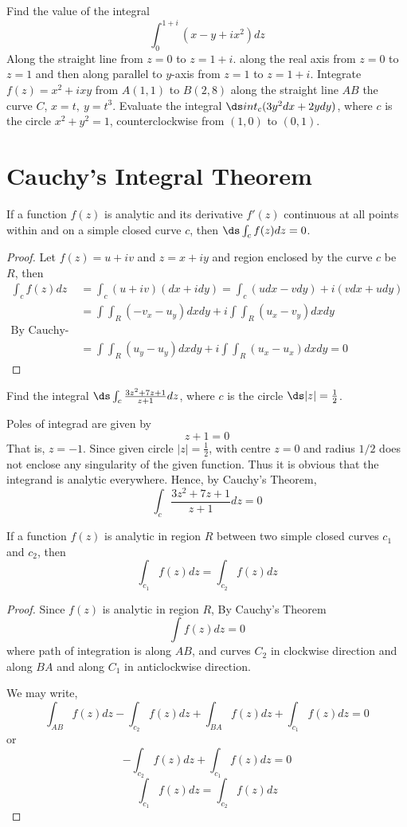 \begin{problems}
\prob Find the value of the integral 
\[\int_0^{1+i}(x-y+ix^2)dz\]
\subprob Along the straight line from $z=0$ to $z=1+i$.
\subprob along the real axis from $z=0$ to $z=1$ and then along parallel to $y$-axis from $z=1$ to $z=1+i$.
\prob Integrate $f(z) = x^2 + ixy$ from $A(1,1)$ to $B(2,8)$ along
\subprob the straight line $AB$
\subprob the curve $C$, $x=t, ~y=t^3$.
\prob Evaluate the integral $\ds int_c (3y^2dx+2ydy)$, where $c$ is the circle $x^2+y^2=1$, counterclockwise from $(1,0)$ to $(0,1)$.

\end{problems}

\section{Cauchy's Integral Theorem}
\begin{thm}
If a function $f(z)$ is analytic and its derivative $f'(z)$ continuous at all points within and on a simple closed curve $c$, then $\ds \int_c f(z) dz = 0$.
\end{thm}
\begin{proof}
Let $f(z)=u+iv$ and $z=x+iy$ and region enclosed by the curve $c$ be $R$, then
\begin{align*}
	\int_cf(z)dz 	&= \int_c(u+iv)(dx+idy) =  \int_c(udx-vdy) + i(vdx+udy)\\
								&= \int\int_R (-v_x - u_y)dxdy + i\int\int_R (u_x - v_y)dxdy\\
								\text{By Cauchy-Riemann equations,} \\
								&= \int\int_R (u_y - u_y)dxdy + i\int\int_R (u_x - u_x)dxdy =0
\end{align*}
\end{proof}
\begin{example}
Find the integral $\ds \int_c \frac{3z^2+7z+1}{z+1}dz$, where $c$ is the circle $\ds |z|=\frac{1}{2}$.
\end{example}
\begin{solution}
Poles of integrad are given by
$$z+1 = 0$$
That is, $z=-1$. Since given circle $|z|=\frac{1}{2}$, with centre $z=0$ and radius $1/2$ does not enclose any singularity of the given function. Thus it is obvious that the integrand is analytic everywhere. Hence, by Cauchy's Theorem,
\[\int_c \frac{3z^2+7z+1}{z+1}dz = 0\]
\end{solution}
\begin{thm}
If a function $f(z)$ is analytic in region $R$ between two simple closed curves $c_1$ and $c_2$, then
\[\int_{c_1} f(z) dz = \int_{c_2} f(z) dz\]
\end{thm}
\begin{proof}
Since $f(z)$ is analytic in region $R$, By Cauchy's Theorem
\[\int f(z) dz = 0\]
where path of integration is along $AB$, and curves $C_2$ in clockwise direction and along $BA$ and along $C_1$ in anticlockwise direction.

We may write,
\[\int_{AB} f(z) dz - \int_{c_2} f(z) dz + \int_{BA} f(z) dz + \int_{c_1} f(z) dz = 0\]
or
\[- \int_{c_2} f(z) dz +  \int_{c_1} f(z) dz = 0\]
\[ \int_{c_1} f(z) dz =  \int_{c_2} f(z) dz \]
\end{proof}

